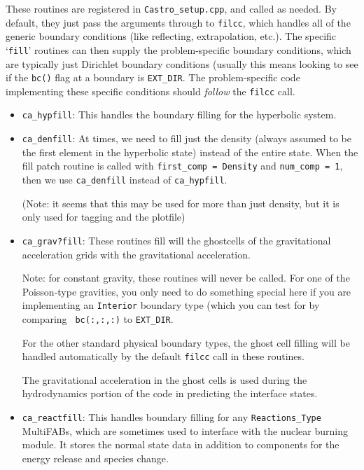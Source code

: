 \begin{itemize}
  These routines are registered in {\tt Castro\_setup.cpp}, and
  called as needed.  By default, they just
  pass the arguments through to {\tt filcc}, which handles all of
  the generic boundary conditions (like reflecting, extrapolation,
  etc.).  The specific `{\tt fill}' routines can then supply the
  problem-specific boundary conditions, which are typically just
  Dirichlet boundary conditions (usually this means looking to see
  if the {\tt bc()} flag at a boundary is {\tt EXT\_DIR}.  The
  problem-specific code implementing these specific conditions
  should {\em follow} the {\tt filcc} call.
        
  \begin{itemize}
  \item {\tt ca\_hypfill}:
    This handles the boundary filling for the hyperbolic system.

  \item {\tt ca\_denfill}: At times, we need to fill just the density
    (always assumed to be the first element in the hyperbolic state)
    instead of the entire state.  When the fill patch routine is called
    with {\tt first\_comp = Density} and {\tt num\_comp = 1}, then we
    use {\tt ca\_denfill} instead of {\tt ca\_hypfill}.
    
    (Note: it seems that this may be used for more than just
    density, but it is only used for tagging and the plotfile)
      
  \item {\tt ca\_grav?fill}: These routines fill will the ghostcells
    of the gravitational acceleration grids with the gravitational
    acceleration.

    Note: for constant gravity, these routines will never be called.
    For one of the Poisson-type gravities, you only need to do
    something special here if you are implementing an {\tt Interior}
    boundary type (which you can test for by comparing {\tt
    bc(:,:,:)} to {\tt EXT\_DIR}.

    For the other standard physical boundary types, the ghost cell
    filling will be handled automatically by the default {\tt filcc}
    call in these routines.

    The gravitational acceleration in the ghost cells is used during
    the hydrodynamics portion of the code in predicting the
    interface states.

  \item {\tt ca\_reactfill}: This handles boundary filling for
    any {\tt Reactions\_Type} MultiFABs, which are sometimes used to interface
    with the nuclear burning module. It stores the normal state data
    in addition to components for the energy release and species change.


\end{itemize}
\end{itemize}
